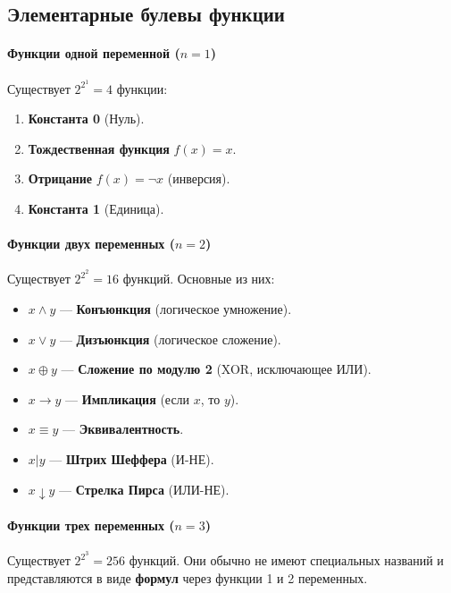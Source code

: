\subsection*{Элементарные булевы функции}

\paragraph{Функции одной переменной ($n=1$)}
Существует $2^{2^1} = 4$ функции:
\begin{enumerate}
    \item \textbf{Константа 0} (Нуль).
    \item \textbf{Тождественная функция} $f(x) = x$.
    \item \textbf{Отрицание} $f(x) = \neg x$ (инверсия).
    \item \textbf{Константа 1} (Единица).
\end{enumerate}

\paragraph{Функции двух переменных ($n=2$)}
Существует $2^{2^2} = 16$ функций. Основные из них:
\begin{itemize}
    \item $x \land y$ — \textbf{Конъюнкция} (логическое умножение).
    \item $x \lor y$ — \textbf{Дизъюнкция} (логическое сложение).
    \item $x \oplus y$ — \textbf{Сложение по модулю 2} (XOR, исключающее ИЛИ).
    \item $x \to y$ — \textbf{Импликация} (если $x$, то $y$).
    \item $x \equiv y$ — \textbf{Эквивалентность}.
    \item $x | y$ — \textbf{Штрих Шеффера} (И-НЕ).
    \item $x \downarrow y$ — \textbf{Стрелка Пирса} (ИЛИ-НЕ).
\end{itemize}

\paragraph{Функции трех переменных ($n=3$)}
Существует $2^{2^3} = 256$ функций. Они обычно не имеют специальных названий и представляются в виде \textbf{формул} через функции 1 и 2 переменных.

